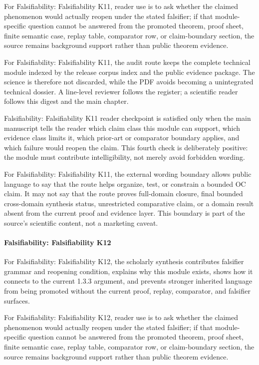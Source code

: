 For Falsifiability: Falsifiability K11, reader use is to ask whether the claimed phenomenon would actually reopen under the stated falsifier; if that module-specific question cannot be answered from the promoted theorem, proof sheet, finite semantic case, replay table, comparator row, or claim-boundary section, the source remains background support rather than public theorem evidence.


For Falsifiability: Falsifiability K11, the audit route keeps the complete technical module indexed by the release corpus index and the public evidence package. The science is therefore not discarded, while the PDF avoids becoming a unintegrated technical dossier. A line-level reviewer follows the register; a scientific reader follows this digest and the main chapter.


Falsifiability: Falsifiability K11 reader checkpoint is satisfied only when the main manuscript tells the reader which claim class this module can support, which evidence class limits it, which prior-art or comparator boundary applies, and which failure would reopen the claim. This fourth check is deliberately positive: the module must contribute intelligibility, not merely avoid forbidden wording.


For Falsifiability: Falsifiability K11, the external wording boundary allows public language to say that the route helps organize, test, or constrain a bounded OC claim. It may not say that the route proves full-domain closure, final bounded cross-domain synthesis status, unrestricted comparative claim, or a domain result absent from the current proof and evidence layer. This boundary is part of the source's scientific content, not a marketing caveat.


\paragraph{Falsifiability: Falsifiability K12}

For Falsifiability: Falsifiability K12, the scholarly synthesis contributes falsifier grammar and reopening condition, explains why this module exists, shows how it connects to the current 1.3.3 argument, and prevents stronger inherited language from being promoted without the current proof, replay, comparator, and falsifier surfaces.


For Falsifiability: Falsifiability K12, reader use is to ask whether the claimed phenomenon would actually reopen under the stated falsifier; if that module-specific question cannot be answered from the promoted theorem, proof sheet, finite semantic case, replay table, comparator row, or claim-boundary section, the source remains background support rather than public theorem evidence.


